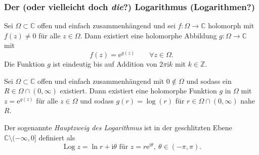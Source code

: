 \documentclass[10pt]{beamer}
\newcommand{\iu}{\mathrm{i}}
\begin{document}
\begin{frame}
	\frametitle{Der (oder vielleicht doch \emph{die}?) Logarithmus (Logarithmen?)}
	\begin{theorem}
		Sei $\Omega \subset \mathbb{C}$ offen und einfach zusammenhängend und sei $f \colon \Omega \to \mathbb{C}$ holomorph mit $f(z) \neq 0$ für alle $z \in \Omega$.
		Dann existiert eine holomorphe Abbildung $g \colon \Omega \to \mathbb{C}$ mit
		\[
			f(z) = \mathrm{e}^{g(z)} \qquad \forall z \in \Omega.
		\]
		\pause
		Die Funktion $g$ ist eindeutig bis auf Addition von $2 \pi \iu k$ mit $k \in \mathbb{Z}$.
	\end{theorem}
	\pause
	\begin{corollary}
		Sei $\Omega \subset \mathbb{C}$ offen und einfach zusammenhängend mit $0 \notin \Omega$ und sodass ein $R \in \Omega \cap (0, \infty)$ existiert.
		Dann existiert eine holomorphe Funktion $g$ in $\Omega$ mit $z = \mathrm{e}^{g(z)}$ für alle $z \in \Omega$ und sodass $g(r) = \log(r)$ für $r \in \Omega \cap (0, \infty)$ nahe $R$.
	\end{corollary}
	\pause
	Der sogenannte \emph{Hauptzweig des Logarithmus} ist in der geschlitzten Ebene $\mathbb{C} \setminus (-\infty, 0]$ definiert als
	\[
		\operatorname{Log} z = \ln r + \iu \theta \text{ für } z = r \mathrm{e}^{\iu \theta}, \ \theta \in (- \pi, \pi).
	\]
\end{frame}
\end{document}
